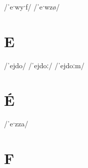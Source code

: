 \documentclass[10pt,a4paper,twoside]{book}
\begin{document}
\begin{multicols}{3}
 {/ˈeˑwyˑf/} {}
 {/ˈeˑwzø/} {}
\end{multicols}

\section*{E}

\begin{multicols}{3}
 {/ˈejdo/} {}
 {/ˈejdoː/} {}
 {/ˈejdoːm/} {}
\end{multicols}

\section*{É}

\begin{multicols}{3}
 {/ˈeˑzza/} {}
\end{multicols}

\section*{F}
\end{document}
